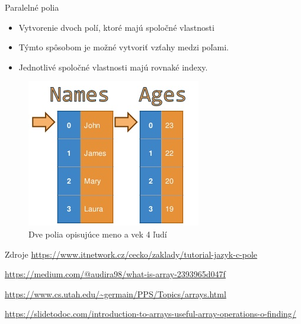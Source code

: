 \documentclass[10pt,xcolor=pdflatex,hyperref={unicode}]{beamer}
\begin{document}
\begin{frame}{Paralelné polia}
     \begin{itemize}
         \item Vytvorenie dvoch polí, ktoré majú spoločné vlastnosti
         \item Týmto spôsobom je možné vytvoriť vzťahy medzi poľami.
         \item Jednotlivé spoločné vlastnosti majú rovnaké indexy.
     \end{itemize}

    \begin{figure}
        \centering
        \includegraphics[scale=0.8]{parallel.png}
        \caption{Dve polia opisujúce meno a vek 4 ľudí}
    \end{figure}

\end{frame}

\begin{frame}{Zdroje}
\small
\url{https://www.itnetwork.cz/cecko/zaklady/tutorial-jazyk-c-pole}
\medskip

\url{https://medium.com/@audira98/what-is-array-2393965d047f}
\medskip

\url{https://www.cs.utah.edu/~germain/PPS/Topics/arrays.html}
\medskip

\url{https://slidetodoc.com/introduction-to-arrays-useful-array-operations-o-finding/}

\end{frame}
\end{document}
